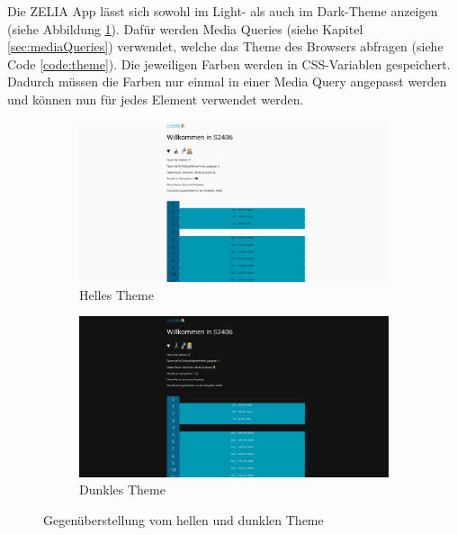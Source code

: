 
Die ZELIA App lässt sich sowohl im Light- als auch im Dark-Theme anzeigen (siehe Abbildung \ref{fig:theme}). Dafür werden Media Queries (siehe Kapitel \ref{sec:mediaQueries}) verwendet, welche das Theme des Browsers abfragen (siehe Code \ref{code:theme}). 
Die jeweiligen Farben werden in CSS-Variablen gespeichert. Dadurch müssen die Farben nur einmal in einer Media Query angepasst werden und können nun für jedes Element verwendet werden. 

\begin{figure}[H]
    \begin{subfigure}[c]{0.5\textwidth}
        \centering
        \includegraphics[width=\textwidth]{media/ResponsiveDesign/ZeliaDesktop.png}
        \caption{Helles Theme}
    \end{subfigure} \hfill
    \begin{subfigure}[c]{0.5\textwidth}
        \centering
        \includegraphics[width=\textwidth]{media/ResponsiveDesign/ZeliaDesktopDark.png}
        \caption{Dunkles Theme}
    \end{subfigure}
    \caption{Gegenüberstellung vom hellen und dunklen Theme}
    \label{fig:theme}
\end{figure}

